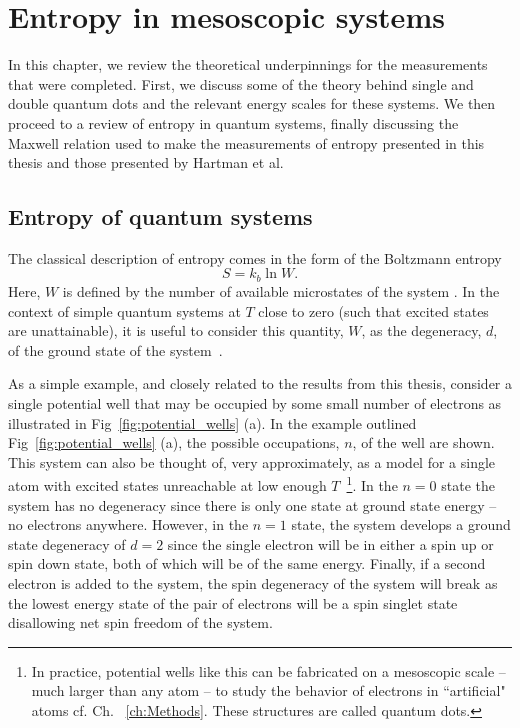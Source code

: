 
\chapter{Entropy in mesoscopic systems}
\label{ch:Theory}

In this chapter, we review the theoretical underpinnings for the measurements that were completed. First, we discuss some of the theory behind single and double quantum dots and the relevant energy scales for these systems. We then proceed to a review of entropy in quantum systems, finally discussing the Maxwell relation used to make the measurements of entropy presented in this thesis and those presented by Hartman et al.

\section{Entropy of quantum systems}
The classical description of entropy comes in the form of the Boltzmann entropy
\begin{equation}
	\label{eqn:b_entropy}
	S = k_b \ln W.
\end{equation}
Here, $W$ is defined by the number of available microstates of the system \cite{schroeder}. In the context of simple quantum systems at $T$ close to zero (such that excited states are unattainable), it is useful to consider this quantity, $W$, as the degeneracy, $d$, of the ground state of the system~\cite{mcquarrie}. 

As a simple example, and closely related to the results from this thesis, consider a single potential well that may be occupied by some small number of electrons as illustrated in Fig~\ref{fig:potential_wells} (a).  In the example outlined Fig~\ref{fig:potential_wells} (a), the possible occupations, $n$, of the well are shown. This system can also be thought of, very approximately, as a model for a single atom with excited states unreachable at low enough $T$~\footnote{In practice, potential wells like this can be fabricated on a mesoscopic scale -- much larger than any atom -- to study the behavior of electrons in ``artificial" atoms cf. Ch. ~\ref{ch:Methods}. These structures are called quantum dots.}. In the $n = 0$ state the system has no degeneracy since there is only one state at ground state energy -- no electrons anywhere. However, in the $n=1$ state, the system develops a ground state degeneracy of $d = 2$ since the single electron will be in either a spin up or spin down state, both of which will be of the same energy. Finally, if a second electron is added to the system, the spin degeneracy of the system will break as the lowest energy state of the pair of electrons will be a spin singlet state disallowing net spin freedom of the system. 

